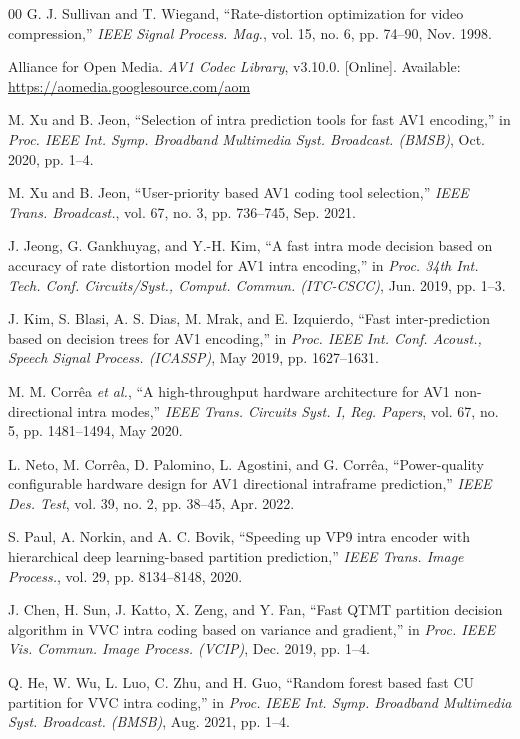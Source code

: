\documentclass[conference]{IEEEtran}
\begin{document}
\begin{thebibliography}{00}
 G. J. Sullivan and T. Wiegand, ``Rate-distortion optimization for video compression,'' \emph{IEEE Signal Process. Mag.}, vol. 15, no. 6, pp. 74--90, Nov. 1998.

 Alliance for Open Media. \emph{AV1 Codec Library}, v3.10.0. [Online]. Available: \url{https://aomedia.googlesource.com/aom}

 M. Xu and B. Jeon, ``Selection of intra prediction tools for fast AV1 encoding,'' in \emph{Proc. IEEE Int. Symp. Broadband Multimedia Syst. Broadcast. (BMSB)}, Oct. 2020, pp. 1--4.

 M. Xu and B. Jeon, ``User-priority based AV1 coding tool selection,'' \emph{IEEE Trans. Broadcast.}, vol. 67, no. 3, pp. 736--745, Sep. 2021.

 J. Jeong, G. Gankhuyag, and Y.-H. Kim, ``A fast intra mode decision based on accuracy of rate distortion model for AV1 intra encoding,'' in \emph{Proc. 34th Int. Tech. Conf. Circuits/Syst., Comput. Commun. (ITC-CSCC)}, Jun. 2019, pp. 1--3.

 J. Kim, S. Blasi, A. S. Dias, M. Mrak, and E. Izquierdo, ``Fast inter-prediction based on decision trees for AV1 encoding,'' in \emph{Proc. IEEE Int. Conf. Acoust., Speech Signal Process. (ICASSP)}, May 2019, pp. 1627--1631.

 M. M. Corr\^ea \emph{et al.}, ``A high-throughput hardware architecture for AV1 non-directional intra modes,'' \emph{IEEE Trans. Circuits Syst. I, Reg. Papers}, vol. 67, no. 5, pp. 1481--1494, May 2020.

 L. Neto, M. Corr\^ea, D. Palomino, L. Agostini, and G. Corr\^ea, ``Power-quality configurable hardware design for AV1 directional intraframe prediction,'' \emph{IEEE Des. Test}, vol. 39, no. 2, pp. 38--45, Apr. 2022.

 S. Paul, A. Norkin, and A. C. Bovik, ``Speeding up VP9 intra encoder with hierarchical deep learning-based partition prediction,'' \emph{IEEE Trans. Image Process.}, vol. 29, pp. 8134--8148, 2020.

 J. Chen, H. Sun, J. Katto, X. Zeng, and Y. Fan, ``Fast QTMT partition decision algorithm in VVC intra coding based on variance and gradient,'' in \emph{Proc. IEEE Vis. Commun. Image Process. (VCIP)}, Dec. 2019, pp. 1--4.

 Q. He, W. Wu, L. Luo, C. Zhu, and H. Guo, ``Random forest based fast CU partition for VVC intra coding,'' in \emph{Proc. IEEE Int. Symp. Broadband Multimedia Syst. Broadcast. (BMSB)}, Aug. 2021, pp. 1--4.


\end{thebibliography}
\end{document}
